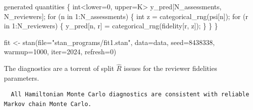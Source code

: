 \documentclass[
  letterpaper,
  DIV=11,
  numbers=noendperiod]{scrartcl}
\newenvironment{Shaded}{\begin{snugshade}}{\end{snugshade}}
\newcommand{\AttributeTok}[1]{\textcolor[rgb]{0.40,0.45,0.13}{#1}}
\newcommand{\ControlFlowTok}[1]{\textcolor[rgb]{0.00,0.23,0.31}{#1}}
\newcommand{\DataTypeTok}[1]{\textcolor[rgb]{0.68,0.00,0.00}{#1}}
\newcommand{\DecValTok}[1]{\textcolor[rgb]{0.68,0.00,0.00}{#1}}
\newcommand{\FunctionTok}[1]{\textcolor[rgb]{0.28,0.35,0.67}{#1}}
\newcommand{\KeywordTok}[1]{\textcolor[rgb]{0.00,0.23,0.31}{#1}}
\newcommand{\NormalTok}[1]{\textcolor[rgb]{0.00,0.23,0.31}{#1}}
\newcommand{\OtherTok}[1]{\textcolor[rgb]{0.00,0.23,0.31}{#1}}
\newcommand{\SpecialCharTok}[1]{\textcolor[rgb]{0.37,0.37,0.37}{#1}}
\newcommand{\StringTok}[1]{\textcolor[rgb]{0.13,0.47,0.30}{#1}}
\begin{document}
\begin{codelisting}
\begin{Shaded}
\begin{Highlighting}[]
\KeywordTok{generated quantities}\NormalTok{ \{}
  \DataTypeTok{int}\NormalTok{\textless{}}\KeywordTok{lower}\NormalTok{=}\DecValTok{0}\NormalTok{, }\KeywordTok{upper}\NormalTok{=K\textgreater{} y\_pred[N\_assessments, N\_reviewers];}
  \ControlFlowTok{for}\NormalTok{ (n }\ControlFlowTok{in} \DecValTok{1}\NormalTok{:N\_assessments) \{}
    \DataTypeTok{int}\NormalTok{ z = categorical\_rng(psi[n]);}
    \ControlFlowTok{for}\NormalTok{ (r }\ControlFlowTok{in} \DecValTok{1}\NormalTok{:N\_reviewers) \{}
\NormalTok{      y\_pred[n, r] = categorical\_rng(fidelity[r, z]);}
\NormalTok{    \}}
\NormalTok{  \}}
\NormalTok{\}}
\end{Highlighting}
\end{Shaded}

\end{codelisting}

\begin{Shaded}
\begin{Highlighting}[]
\NormalTok{fit }\OtherTok{\textless{}{-}} \FunctionTok{stan}\NormalTok{(}\AttributeTok{file=}\StringTok{"stan\_programs/fit1.stan"}\NormalTok{,}
            \AttributeTok{data=}\NormalTok{data, }\AttributeTok{seed=}\DecValTok{8438338}\NormalTok{,}
            \AttributeTok{warmup=}\DecValTok{1000}\NormalTok{, }\AttributeTok{iter=}\DecValTok{2024}\NormalTok{, }\AttributeTok{refresh=}\DecValTok{0}\NormalTok{)}
\end{Highlighting}
\end{Shaded}

The diagnostics are a torrent of split \(\hat{R}\) issues for the
reviewer fidelities parameters.

\begin{Shaded}
\end{Shaded}

\begin{verbatim}
  All Hamiltonian Monte Carlo diagnostics are consistent with reliable
Markov chain Monte Carlo.
\end{verbatim}
\end{document}
